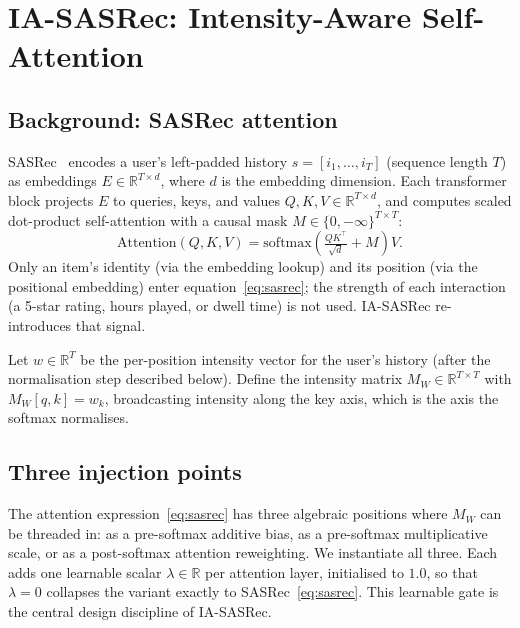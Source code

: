 \section{IA-SASRec: Intensity-Aware Self-Attention}
\label{sec:method}

\subsection{Background: SASRec attention}
\label{sec:method:background}

SASRec~\citep{kang2018sasrec} encodes a user's left-padded history
$s = [i_1, \dots, i_T]$ (sequence length $T$) as embeddings
$E \in \mathbb{R}^{T \times d}$, where $d$ is the embedding dimension.
Each transformer block projects $E$ to queries, keys, and values
$Q, K, V \in \mathbb{R}^{T \times d}$, and computes scaled dot-product
self-attention with a causal mask $M \in \{0, -\infty\}^{T \times T}$:
\begin{equation}
\mathrm{Attention}(Q, K, V) = \mathrm{softmax}\!\left(\tfrac{QK^{\top}}{\sqrt{d}} + M\right) V.
\label{eq:sasrec}
\end{equation}
Only an item's identity (via the embedding lookup) and its position (via the
positional embedding) enter equation~\eqref{eq:sasrec}; the
strength of each interaction (a 5-star rating, hours played,
or dwell time) is not used. IA-SASRec re-introduces that signal.

Let $w \in \mathbb{R}^T$ be the per-position intensity vector for the
user's history (after the normalisation step described below). Define
the intensity matrix $M_W \in \mathbb{R}^{T \times T}$ with
$M_W[q, k] = w_k$, broadcasting intensity along the key axis,
which is the axis the softmax normalises.

\subsection{Three injection points}
\label{sec:method:variants}

The attention expression~\eqref{eq:sasrec} has three algebraic positions
where $M_W$ can be threaded in: as a pre-softmax additive bias, as a
pre-softmax multiplicative scale, or as a post-softmax attention reweighting.
We instantiate all three. Each adds one learnable scalar
$\lambda \in \mathbb{R}$ per attention layer, initialised to $1.0$, so
that $\lambda = 0$ collapses the variant exactly to
SASRec~\eqref{eq:sasrec}. This learnable gate is the central design
discipline of IA-SASRec.

